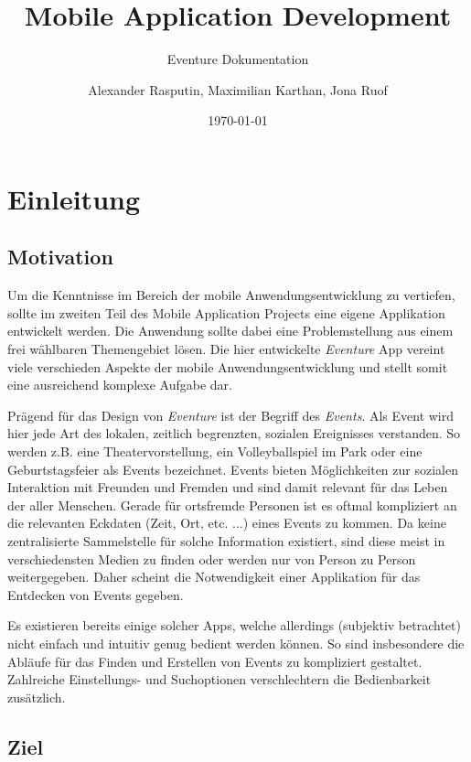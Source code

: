\documentclass{scrartcl}
\title{Mobile Application Development}
\subtitle{Eventure Dokumentation}
\date{\today}
\author{Alexander Rasputin, Maximilian Karthan, Jona Ruof}
\begin{document}
\maketitle
\newpage
\tableofcontents

\newpage

\section{Einleitung}
\subsection{Motivation}

Um die Kenntnisse im Bereich der mobile Anwendungsentwicklung zu vertiefen,
sollte im zweiten Teil des Mobile Application Projects eine eigene Applikation
entwickelt werden. Die Anwendung sollte dabei eine Problemstellung aus einem
frei wählbaren Themengebiet lösen. Die hier entwickelte \emph{Eventure} App
vereint viele verschieden Aspekte der mobile Anwendungsentwicklung und stellt
somit eine ausreichend komplexe Aufgabe dar.

Prägend für das Design von \emph{Eventure} ist der Begriff des \emph{Events}.
Als Event wird hier jede Art des lokalen, zeitlich begrenzten, sozialen
Ereignisses verstanden. So werden z.B. eine Theatervorstellung, ein
Volleyballspiel im Park oder eine Geburtstagsfeier als Events bezeichnet. Events
bieten Möglichkeiten zur sozialen Interaktion mit Freunden und Fremden und sind
damit relevant für das Leben der aller Menschen. Gerade für ortsfremde
Personen ist es oftmal kompliziert an die relevanten Eckdaten (Zeit, Ort, etc.
 ...) eines Events zu kommen. Da keine zentralisierte Sammelstelle für solche
Information existiert, sind diese meist in verschiedensten Medien zu finden oder
werden nur von Person zu Person weitergegeben. Daher scheint die Notwendigkeit
einer Applikation für das Entdecken von Events gegeben.

Es existieren bereits einige solcher Apps, welche allerdings (subjektiv
betrachtet) nicht einfach und intuitiv genug bedient werden können. So sind
insbesondere die Abläufe für das Finden und Erstellen von Events zu kompliziert
gestaltet. Zahlreiche Einstellungs- und Suchoptionen verschlechtern die
Bedienbarkeit zusätzlich.

\subsection{Ziel}
\end{document}
